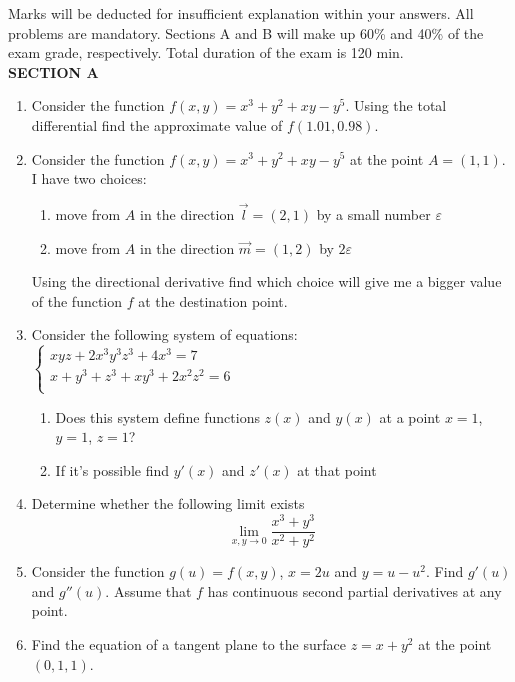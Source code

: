 \documentclass[12pt]{article} %
\theoremstyle{definition} %
\begin{document}

Marks will be deducted for insufficient explanation within your answers. All problems are mandatory. Sections A and B will make up 60\% and 40\% of the exam grade, respectively. Total duration of the exam is 120 min. \\

\textbf{SECTION A}
\vspace{20pt}

\begin{enumerate}
\item Consider the function $f(x,y)=x^3+y^2+xy-y^5$. Using the total differential find the approximate value of $f(1.01,0.98)$.
\item Consider the function $f(x,y)=x^3+y^2+xy-y^5$ at the point $A=(1,1)$. I have two choices:
\begin{enumerate}
\item move from $A$ in the direction $\vec{l}=(2,1)$ by a small number $\varepsilon$
\item move from $A$ in the direction $\vec{m}=(1,2)$ by $2\varepsilon$
\end{enumerate}
Using the directional derivative find which choice will give me a bigger value of the function $f$ at the destination point.

\item Consider the following system of equations:\\
$\left\{\begin{array}{l}
xyz+2x^3y^3z^3+4x^3=7\\
x+y^3+z^3+xy^3+2x^2z^2=6\\
\end{array}\right.$
\begin{enumerate}
\item Does this system define functions $z(x)$ and $y(x)$ at a point $x=1$, $y=1$, $z=1$?
\item If it's possible find $y'(x)$ and $z'(x)$ at that point
\end{enumerate}

\item Determine whether the following limit exists
\begin{equation} \nonumber
\lim_{x, y\to 0} \frac{x^3+y^3}{x^2+y^2}
\end{equation}

\item Consider the function $g(u)=f(x,y)$, $x=2u$ and $y=u-u^2$. Find $g'(u)$ and $g''(u)$. Assume that $f$ has continuous second partial derivatives at any point.

\item Find the equation of a tangent plane to the surface $z=x+y^2$ at the point $(0,1,1)$.



\end{enumerate}
\end{document}
